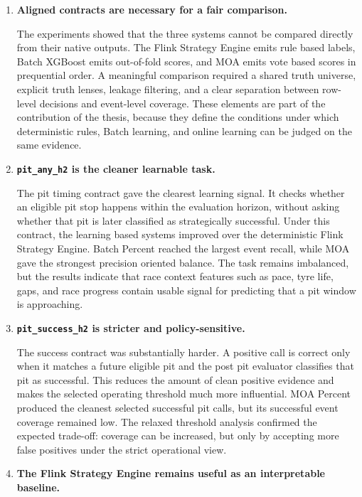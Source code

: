 \begin{enumerate}
    \item \textbf{Aligned contracts are necessary for a fair comparison.}

          The experiments showed that the three systems cannot be compared directly from their native outputs. The Flink Strategy Engine emits rule based labels, Batch
          XGBoost emits out-of-fold scores, and MOA emits vote based scores in prequential order. A meaningful comparison required a shared truth universe, explicit truth
          lenses, leakage filtering, and a clear separation between row-level decisions and event-level coverage. These elements are part of the contribution of the thesis,
          because they define the conditions under which deterministic rules, Batch learning, and online learning can be judged on the same evidence.

    \item \textbf{\texttt{pit\_any\_h2} is the cleaner learnable task.}

          The pit timing contract gave the clearest learning signal. It checks whether an eligible pit stop happens within the evaluation horizon, without asking whether
          that pit is later classified as strategically successful. Under this contract, the learning based systems improved over the deterministic Flink Strategy Engine.
          Batch Percent reached the largest event recall, while MOA gave the strongest precision oriented balance. The task remains imbalanced, but the results indicate
          that race context features such as pace, tyre life, gaps, and race progress contain usable signal for predicting that a pit window is approaching.

    \item \textbf{\texttt{pit\_success\_h2} is stricter and policy-sensitive.}

          The success contract was substantially harder. A positive call is correct only when it matches a future eligible pit and the post pit evaluator classifies that
          pit as successful. This reduces the amount of clean positive evidence and makes the selected operating threshold much more influential. MOA Percent produced the
          cleanest selected successful pit calls, but its successful event coverage remained low. The relaxed threshold analysis confirmed the expected trade-off: coverage
          can be increased, but only by accepting more false positives under the strict operational view.

    \item \textbf{The Flink Strategy Engine remains useful as an interpretable baseline.}


\end{enumerate}

